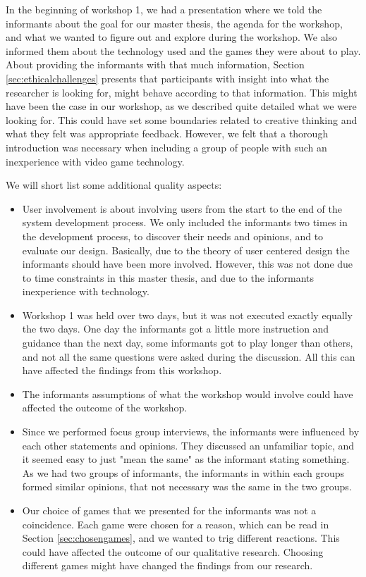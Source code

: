 In the beginning of workshop 1, we had a presentation where we told the informants about the goal for our master thesis, the agenda for the workshop, and what we wanted to figure out and explore during the workshop. We also informed them about the technology used and the games they were about to play. About providing the informants with that much information, Section \ref{sec:ethicalchallenges} presents that participants with insight into what the researcher is looking for, might behave according to that information. This might have been the case in our workshop, as we described quite detailed what we were looking for. This could have set some boundaries related to creative thinking and what they felt was appropriate feedback. However, we felt that a thorough introduction was necessary when including a group of people with such an inexperience with video game technology. 

We will short list some additional quality aspects: 
\begin{itemize}
\renewcommand{\labelitemi}{$\bullet$}
\item User involvement is about involving users from the start to the end of the system development process. We only included the informants two times in the development process, to discover their needs and opinions, and to evaluate our design. Basically, due to the theory of user centered design the informants should have been more involved. However, this was not done due to time constraints in this master thesis, and due to the informants inexperience with technology. 
\item Workshop 1 was held over two days, but it was not executed exactly equally the two days. One day the informants got a little more instruction and guidance than the next day, some informants got to play longer than others, and not all the same questions were asked during the discussion. All this can have affected the findings from this workshop. 
\item The informants assumptions of what the workshop would involve could have affected the outcome of the workshop. 
\item Since we performed focus group interviews, the informants were influenced by each other statements and opinions. They discussed an unfamiliar topic, and it seemed easy to just "mean the same" as the informant stating something. As we had two groups of informants, the informants in within each groups formed similar opinions, that not necessary was the same in the two groups.   
\item Our choice of games that we presented for the informants was not a coincidence. Each game were chosen for a reason, which can be read in Section \ref{sec:chosengames}, and we wanted to trig different reactions. This could have affected the outcome of our qualitative research. Choosing different games might have changed the findings from our research. 
\end{itemize}


